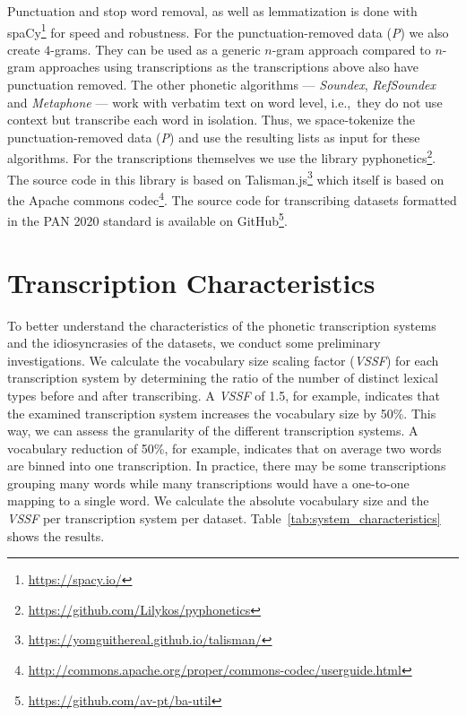 Punctuation and stop word removal, as well as lemmatization is done with spaCy\footnote{\url{https://spacy.io/}} for speed and robustness.
For the punctuation-removed data (\textit{P}) we also create $4$-grams.
They can be used as a generic $n$-gram approach compared to $n$-gram approaches using transcriptions as the transcriptions above also have punctuation removed.
The other phonetic algorithms --- \textit{Soundex}, \textit{RefSoundex} and \textit{Metaphone} --- work with verbatim text on word level, i.e.,\ they do not use context but transcribe each word in isolation.
Thus, we space-tokenize the punctuation-removed data (\textit{P}) and use the resulting lists as input for these algorithms.
For the transcriptions themselves we use the library pyphonetics\footnote{\url{https://github.com/Lilykos/pyphonetics}}.
The source code in this library is based on Talisman.js\footnote{\url{https://yomguithereal.github.io/talisman/}} which itself is based on the Apache commons codec\footnote{\url{http://commons.apache.org/proper/commons-codec/userguide.html}}.
The source code for transcribing datasets formatted in the PAN 2020 standard is available on GitHub\footnote{\url{https://github.com/av-pt/ba-util}}.

\section{Transcription Characteristics}
To better understand the characteristics of the phonetic transcription systems and the idiosyncrasies of the datasets, we conduct some preliminary investigations.
We calculate the vocabulary size scaling factor (\textit{VSSF}) for each transcription system by determining the ratio of the number of distinct lexical types before and after transcribing.
A \textit{VSSF} of 1.5, for example, indicates that the examined transcription system increases the vocabulary size by 50\%.
This way, we can assess the granularity of the different transcription systems.
A vocabulary reduction of 50\%, for example, indicates that on average two words are binned into one transcription.
In practice, there may be some transcriptions grouping many words while many transcriptions would have a one-to-one mapping to a single word.
We calculate the absolute vocabulary size and the \textit{VSSF} per transcription system per dataset.
Table~\ref{tab:system_characteristics} shows the results.\newline

